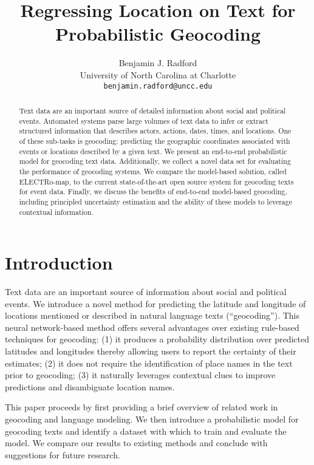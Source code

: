 \documentclass[11pt,a4paper]{article}
\title{Regressing Location on Text for Probabilistic Geocoding}
\author{Benjamin J. Radford \\
  University of North Carolina at Charlotte\\
  \texttt{benjamin.radford@uncc.edu} \\}
\date{}
\begin{document}
\maketitle
\thispagestyle{fancy}
\begin{abstract}
Text data are an important source of detailed information about social and political events. Automated systems parse large volumes of text data to infer or extract structured information that describes actors, actions, dates, times, and locations. One of these sub-tasks is geocoding: predicting the geographic coordinates associated with events or locations described by a given text. We present an end-to-end probabilistic model for geocoding text data. Additionally, we collect a novel data set for evaluating the performance of geocoding systems. We compare the model-based solution, called ELECTRo-map, to the current state-of-the-art open source system for geocoding texts for event data. Finally, we discuss the benefits of end-to-end model-based geocoding, including principled uncertainty estimation and the ability of these models to leverage contextual information. 
\end{abstract}

\section{Introduction}
\label{sec:overview}

Text data are an important source of information about social and political events. We introduce a novel method for predicting the latitude and longitude of locations mentioned or described in natural language texts (``geocoding''). This neural network-based method offers several advantages over existing rule-based techniques for geocoding: (1) it produces a probability distribution over predicted latitudes and longitudes thereby allowing users to report the certainty of their estimates; (2) it does not require the identification of place names in the text prior to geocoding; (3) it naturally leverages contextual clues to improve predictions and disambiguate location names.

This paper proceeds by first providing a brief overview of related work in geocoding and language modeling. We then introduce a probabilistic model for geocoding texts and identify a dataset with which to train and evaluate the model. We compare our results to existing methods and conclude with suggestions for future research.

\end{document}

